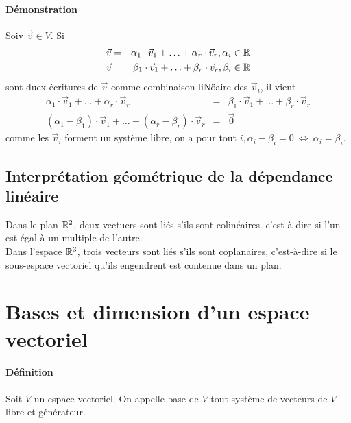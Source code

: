 \paragraph*{Démonstration} Soiv $\vec{v} \in V$. Si 
\begin{eqnarray*}
  \vec{v} &=& \alpha_1 \cdot \vec{v}_1 + \ldots + \alpha_r \cdot \vec{v}_r, \alpha_i \in \mathbb{R} \\
  \vec{v} &=& \beta_1 \cdot \vec{v}_1 + \ldots + \beta_r \cdot \vec{v}_r, \beta_i \in \mathbb{R} 
\end{eqnarray*}
sont duex écritures de $\vec{v}$ comme combinaison liNöaire des $\vec{v}_i$, il vient
\begin{eqnarray*}
  \alpha_1 \cdot \vec{v}_1 + \ldots + \alpha_r \cdot \vec{v}_r &=& \beta_1 \cdot \vec{v}_1 + \ldots + \beta_r \cdot \vec{v}_r \\
  (\alpha_1 - \beta_1) \cdot \vec{v}_1 + \ldots + (\alpha_r - \beta_r) \cdot \vec{v}_r &=& \vec{0}
\end{eqnarray*}
comme les $\vec{v}_i$ forment un système libre, on a pour tout $i, \alpha_i - \beta_i = 0 ~\Leftrightarrow~ \alpha_i = \beta_i$.

\subsection{Interprétation géométrique de la dépendance linéaire}
Dans le plan $\mathbb{R}^2$, deux vectuers sont liés s'ils sont colinéaires. c'est-à-dire si l'un est égal à un multiple de l'autre. \\
Dans l'espace $\mathbb{R}^3$, trois vecteurs sont liés s'ils sont coplanaires, c'est-à-dire si le sous-espace vectoriel qu'ils engendrent est contenue dans un plan.

%
%
\section{Bases et dimension d'un espace vectoriel}
%
%
\paragraph{Définition} Soit $V$ un espace vectoriel. On appelle base de $V$ tout système de vecteurs de $V$ libre et générateur.

